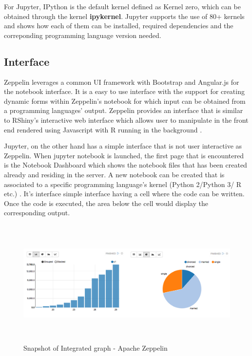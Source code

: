 \documentclass[9pt,twocolumn,twoside]{ ../../styles/osajnl}
\begin{document}
For Jupyter, IPython is the default kernel defined as Kernel zero, which can be obtained through the kernel \textbf{ipykernel}. Jupyter supports the use of 80+ kernels and \cite{www-jupyter-kernel} shows how each of them can be installed, required dependencies and the correponding programming language version needed.

\subsection{Interface}
Zeppelin leverages a common UI framework with Bootstrap and Angular.js for the notebook interface. It is a easy to use interface with the support for creating dynamic forms within Zeppelin's notebook for which input can be obtained from a programming languages' output. Zeppelin provides an interface that is similar to RShiny's interactive web interface which allows user to manipulate in the front end rendered using Javascript with R running in the background \cite{www-rshiny}. 

Jupyter, on the other hand has a simple interface that is not user interactive as Zeppelin. When jupyter notebook is launched, the first page that is encountered is the Notebook Dashboard which shows the notebook files that has been created already and residing in the server. A new notebook can be created that is associated to a specific programming language's kernel (Python 2/Python 3/ R etc.) \cite{www-jupyter-ui}. It's interface simple interface having a cell where the code can be written. Once the code is executed, the area below the cell would display the corresponding output.
\begin{figure}[hbt]
\begin{center}
\centering
\includegraphics[width =\linewidth,height=2.5in]{images/graph}
\caption{Snapshot of Integrated graph - Apache Zeppelin \cite{www-zeppelin}}
\label{fig:graphZep}
\end{center}
\end{figure}
\end{document}
